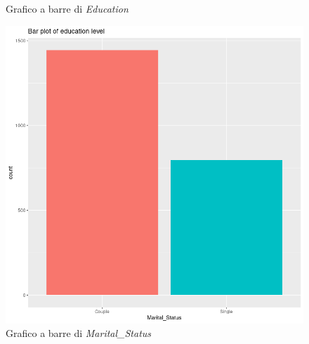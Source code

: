 \begin{frame}[fragile]
\begin{figure}[!htb]
  \caption{Grafico a barre di \textit{Education}}\label{fig:BarPlotEducation}
\endminipage\hfill
{}%
  \includegraphics[width=\linewidth]{Img/eda/EDA051.png}
  \caption{Grafico a barre di \textit{Marital\_Status}}\label{fig:BarPlotMt}
\endminipage
\end{figure}
\end{frame}
